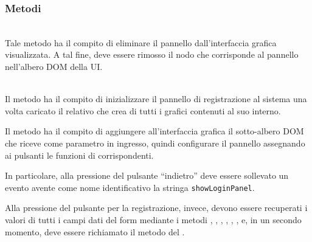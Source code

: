 \subsubsection*{Metodi}
\begin{description}
  \item{}\\
  Tale metodo ha il compito di eliminare il pannello dall’interfaccia grafica visualizzata. A tal fine, deve essere rimosso il nodo che corrisponde al pannello nell’albero DOM della UI\@.
  
  \item{}\\
  	Il metodo ha il compito di inizializzare il pannello di registrazione al sistema una volta caricato il relativo  che crea di tutti i  grafici contenuti al suo interno.
	
	Il metodo ha il compito di aggiungere all'interfaccia grafica il sotto-albero DOM che riceve come parametro in ingresso, quindi configurare il pannello assegnando ai pulsanti le funzioni di  corrispondenti.
	
	In particolare, alla pressione del pulsante ``indietro'' deve essere sollevato un evento avente come nome identificativo la stringa \verb'showLoginPanel'.
	
  Alla pressione del pulsante per la registrazione, invece, devono essere recuperati i valori di tutti i campi dati del form mediante i metodi , , , , , ,  e, in un secondo momento, deve essere richiamato il metodo  del .

\end{description}

